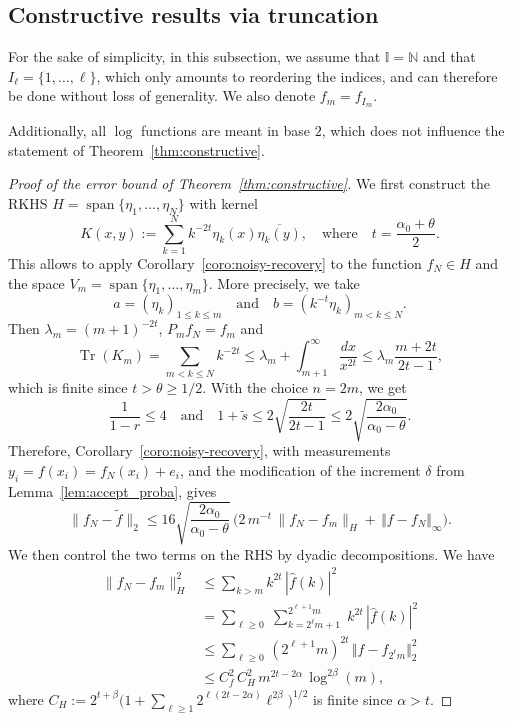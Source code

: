 \documentclass[a4paper,11pt]{article}
\renewcommand{\(}{\left (}
\renewcommand{\)}{\right )}
\newcommand{\<}{\langle}
\renewcommand{\>}{\rangle}
\newcommand{\N}{\mathbb{N}}
\newcommand{\II}{\mathbb{I}}
\theoremstyle{definition}
\DeclareMathOperator{\Span}{span}
\DeclareMathOperator{\Tr}{Tr}
\begin{document}
\subsection{Constructive results via truncation}
\label{subsec:truncation}

For the sake of simplicity, in this subsection, we assume that $\II=\N$ and that $I_\ell=\{1,\dots,\ell\}$, which only amounts to reordering the indices, and can therefore be done without loss of generality. We also denote $f_m=f_{I_m}$.

Additionally, all $\log$ functions are meant in base $2$, which does not influence the statement of Theorem~\ref{thm:constructive}.


\begin{proof}[Proof of the error bound of Theorem~\ref{thm:constructive}]
We first construct the RKHS $H=\Span\{\eta_1,\dots,\eta_N\}$ with kernel
\[
 K(x,y) := \sum_{k=1}^N k^{-2t} \eta_k(x) \overline{\eta_k(y)},\quad\text{where}\quad t=\frac{\alpha_0+\theta}{2}.
\]
This allows to apply Corollary~\ref{coro:noisy-recovery} to the function $f_{N}\in H$ and the space $V_m=\Span\{\eta_1,\dots,\eta_m\}$. More precisely, we take
\begin{equation}
\label{eq:a-b-constructive}
a=(\eta_k)_{1\leq k\leq m}\quad\text{and}\quad b=(k^{-t}\eta_k)_{m< k\leq N}.
\end{equation}
Then $\lambda_m=(m+1)^{-2t}$, $P_mf_{N}=f_{m}$ and
\[
\Tr(K_m)=\sum_{m<k\leq N} k^{-2t}\leq \lambda_m+\int_{m+1}^\infty \frac{dx}{x^{2t}}\leq \lambda_m\frac{m+2t}{2t-1},
\]
which is finite since $t>\theta\geq 1/2$. With the choice $n=2m$, we get
\[
\frac{1}{1-r}\leq 4\quad\text{and}\quad 1+\tilde s\leq 2\sqrt{\frac{2t}{2t-1}}\leq 2\sqrt{\frac{2\alpha_0}{\alpha_0-\theta}}.
\]
Therefore, Corollary~\ref{coro:noisy-recovery}, with measurements $y_i=f(x_i)=f_N(x_i)+e_i$, and the modification of the increment $\delta$ from Lemma~\ref{lem:accept_proba}, gives
\begin{equation} \label{eq:truncation}
\|f_{N}-\tilde f\|_2\leq 16\sqrt{\frac{2\alpha_0}{\alpha_0-\theta}}\,\Big(2\,m^{-t} \,\big\|f_N-f_m \big\|_H
+\,\Vert f-f_N \Vert_{\infty}\Big).
\end{equation}
We then control the two terms on the RHS by dyadic decompositions. We have
\begin{align*}
\|f_N-f_m\|_H^2
&\leq \sum_{k>m}k^{2t}\,|\hat f(k)|^2\\[-1em]
&= \sum_{\ell\geq 0}
\;\sum_{k=2^\ell m+1}^{2^{\ell+1}m}\;
k^{2t}\,|\hat f(k)|^2\\
&\leq \sum_{\ell\geq 0} \,(2^{\ell+1}m)^{2t}\,\Vert f - f_{2^\ell m} \Vert_2^2\\
&\leq C_f^2\,C_H^2\, m^{2t-2\alpha}\,\log^{2\beta}(m),
\end{align*}
where
$
C_H:= 2^{t+\beta}\Big(1+\sum_{\ell\geq 1}2^{\ell(2t-2\alpha)}\ell^{2\beta}\Big)^{1/2}
$
is finite since $\alpha>t$.


\end{proof}
\end{document}
